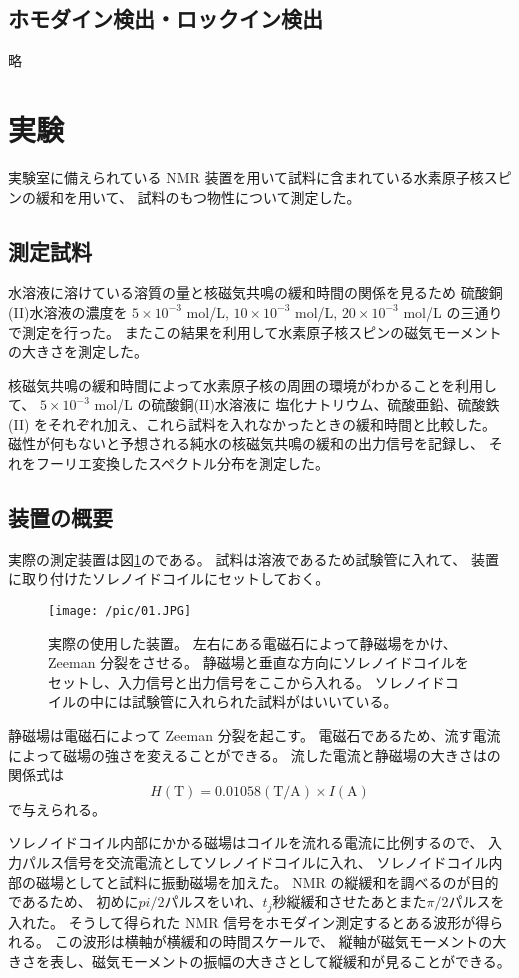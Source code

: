 \documentclass[11pt,dvipdfmx,a4paper]{jsarticle}
\begin{document}
\subsection{ホモダイン検出・ロックイン検出}
略

\section{実験}
実験室に備えられている NMR 装置を用いて試料に含まれている水素原子核スピンの緩和を用いて、
試料のもつ物性について測定した。
\subsection{測定試料}
水溶液に溶けている溶質の量と核磁気共鳴の緩和時間の関係を見るため
硫酸銅(II)水溶液の濃度を
\(5\times 10^{-3}\) mol/L,
\(10\times 10^{-3}\) mol/L,
\(20\times 10^{-3}\) mol/L
の三通りで測定を行った。
またこの結果を利用して水素原子核スピンの磁気モーメントの大きさを測定した。

核磁気共鳴の緩和時間によって水素原子核の周囲の環境がわかることを利用して、
\(5\times 10^{-3}\) mol/L の硫酸銅(II)水溶液に
塩化ナトリウム、硫酸亜鉛、硫酸鉄(II)
をそれぞれ加え、これら試料を入れなかったときの緩和時間と比較した。
磁性が何もないと予想される純水の核磁気共鳴の緩和の出力信号を記録し、
それをフーリエ変換したスペクトル分布を測定した。

\subsection{装置の概要}
実際の測定装置は図\ref{pic:machine}のである。
試料は溶液であるため試験管に入れて、
装置に取り付けたソレノイドコイルにセットしておく。
\begin{figure}
	\centering
	\texttt{[image: /pic/01.JPG]}
	\caption{実際の使用した装置。
	左右にある電磁石によって静磁場をかけ、Zeeman 分裂をさせる。
	静磁場と垂直な方向にソレノイドコイルをセットし、入力信号と出力信号をここから入れる。
	ソレノイドコイルの中には試験管に入れられた試料がはいいている。}
	\label{pic:machine}
\end{figure}

静磁場は電磁石によって Zeeman 分裂を起こす。
電磁石であるため、流す電流によって磁場の強さを変えることができる。
流した電流と静磁場の大きさはの関係式は
\begin{equation}
	H (\text{T}) = 0.01058 (\text{T/A}) \times I (\text{A})
\end{equation}
で与えられる。

ソレノイドコイル内部にかかる磁場はコイルを流れる電流に比例するので、
入力パルス信号を交流電流としてソレノイドコイルに入れ、
ソレノイドコイル内部の磁場としてと試料に振動磁場を加えた。
NMR の縦緩和を調べるのが目的であるため、
初めに\(pi/2\)パルスをいれ、\(t_j\)秒縦緩和させたあとまた\(\pi/2\)パルスを入れた。
そうして得られた NMR 信号をホモダイン測定するとある波形が得られる。
この波形は横軸が横緩和の時間スケールで、
縦軸が磁気モーメントの大きさを表し、磁気モーメントの振幅の大きさとして縦緩和が見ることができる。
\end{document}

